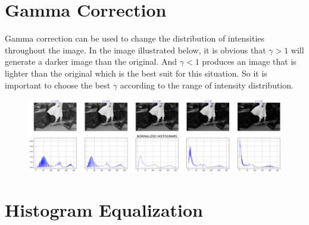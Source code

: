 \documentclass[12pt,a4paper]{article}
\begin{document}
\section{Gamma Correction}
Gamma correction can be used to change the distribution of intensities throughout the image. In the image illustrated below, it is obvious that $\gamma>1$ will generate a darker image than the original. And $\gamma <1$ produces an image that is lighter than the original which is the best suit for this situation. So it is important to choose the best $\gamma$ according to the range of intensity distribution.
\begin{figure}[h]
    \includegraphics[width=\textwidth]{q3.png}
    \centering
\end{figure}


\section{Histogram Equalization}
\end{document}
